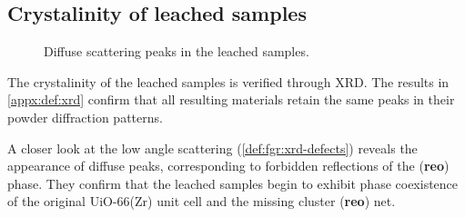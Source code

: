 
\subsection{Crystalinity of leached samples}\label{def:xrd}

\begin{wrapfigure}{r}{0.32\textwidth}
    \centering
    \captionsetup{format=plain}
    \caption{Diffuse scattering peaks in the  leached 
    samples.}%
    \label{def:fgr:xrd-defects}
\end{wrapfigure}

The crystalinity of the leached samples is verified through 
XRD. The results in \autoref{appx:def:xrd} confirm that all 
resulting materials retain the same peaks in their powder
diffraction patterns.

A closer look at the low angle scattering (\autoref{def:fgr:xrd-defects})
reveals the appearance of diffuse peaks, corresponding to forbidden
reflections of the (\textbf{reo}) phase. They confirm that the 
leached samples begin to exhibit phase coexistence of 
the original UiO-66(Zr) unit cell and the missing cluster
(\textbf{reo}) net. 